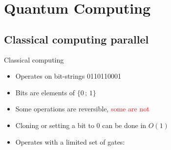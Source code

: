 \documentclass{beamer}
\begin{document}

\section{Quantum Computing}
\subsection{Classical computing parallel}

\begin{frame}{Classical computing}
    \begin{itemize}
        \item Operates on bit-strings 0110110001\pause
        \item Bits are elements of \(\{0\,;\,1\}\)\pause
        \item Some operations are reversible, \textcolor<9->{red}{some are not}\pause
        \item Cloning or setting a bit to 0 can be done in $O(1)$\pause
        \item Operates with a limited set of gates:\pause
        

\end{itemize}
\end{frame}
\end{document}
